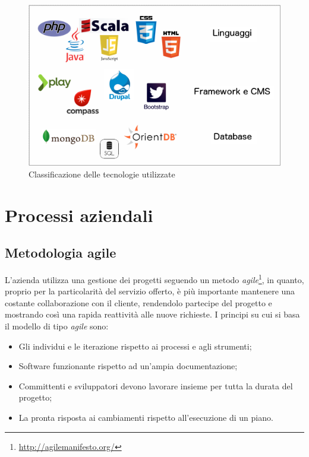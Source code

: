 \begin{figure}[h]
\centering
\includegraphics[width=0.6\linewidth]{immagini/White}
\caption[Classificazione delle tecnologie utilizzate]{Classificazione delle tecnologie utilizzate}
\label{fig:White}
\end{figure}

\newpage
\section{Processi aziendali}
\subsection{Metodologia agile}
L'azienda utilizza una gestione dei progetti seguendo un metodo \textit{agile}\footnote{\url{http://agilemanifesto.org/}}, in quanto, proprio per la particolarità del servizio offerto, è più importante mantenere una costante collaborazione con il cliente, rendendolo partecipe del progetto e mostrando così una rapida reattività alle nuove richieste. I principi su cui si basa il modello di tipo \textit{agile} sono:
\begin{itemize}
	\item Gli individui  e le iterazione rispetto ai processi  e agli strumenti;
	\item Software funzionante rispetto ad un'ampia documentazione;
	\item Committenti e sviluppatori devono lavorare insieme per tutta la durata del progetto;
	\item La pronta risposta ai cambiamenti rispetto all'esecuzione di un piano.
\end{itemize}

